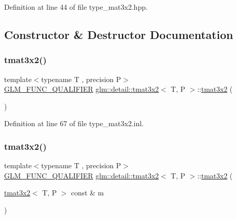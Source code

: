 Definition at line 44 of file type\+\_\+mat3x2.\+hpp.



\subsection{Constructor \& Destructor Documentation}
\mbox{\label{structglm_1_1detail_1_1tmat3x2_a4a7242da8dbcc8b72b09689f47424fe1}} 
\subsubsection{\texorpdfstring{tmat3x2()}{tmat3x2()}\hspace{0.1cm}{\footnotesize\ttfamily [1/22]}}
{\footnotesize\ttfamily template$<$typename T , precision P$>$ \\
\hyperlink{setup_8hpp_a33fdea6f91c5f834105f7415e2a64407}{G\+L\+M\+\_\+\+F\+U\+N\+C\+\_\+\+Q\+U\+A\+L\+I\+F\+I\+ER} \hyperlink{structglm_1_1detail_1_1tmat3x2}{glm\+::detail\+::tmat3x2}$<$ T, P $>$\+::\hyperlink{structglm_1_1detail_1_1tmat3x2}{tmat3x2} (\begin{DoxyParamCaption}{ }\end{DoxyParamCaption})}



Definition at line 67 of file type\+\_\+mat3x2.\+inl.

\mbox{\label{structglm_1_1detail_1_1tmat3x2_ad4a1aebc83113727a6ff015cf870fbf3}} 
\subsubsection{\texorpdfstring{tmat3x2()}{tmat3x2()}\hspace{0.1cm}{\footnotesize\ttfamily [2/22]}}
{\footnotesize\ttfamily template$<$typename T , precision P$>$ \\
\hyperlink{setup_8hpp_a33fdea6f91c5f834105f7415e2a64407}{G\+L\+M\+\_\+\+F\+U\+N\+C\+\_\+\+Q\+U\+A\+L\+I\+F\+I\+ER} \hyperlink{structglm_1_1detail_1_1tmat3x2}{glm\+::detail\+::tmat3x2}$<$ T, P $>$\+::\hyperlink{structglm_1_1detail_1_1tmat3x2}{tmat3x2} (\begin{DoxyParamCaption}\item[{\hyperlink{structglm_1_1detail_1_1tmat3x2}{tmat3x2}$<$ T, P $>$ const \&}]{m }\end{DoxyParamCaption})}




